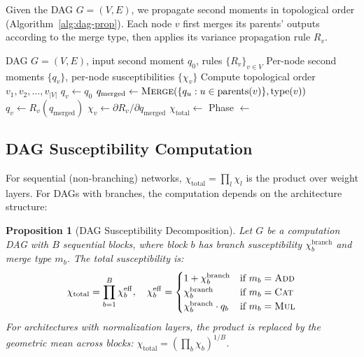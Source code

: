 \documentclass[10pt]{article}
\newtheorem{proposition}[theorem]{Proposition}
\begin{document}
Given the DAG $G = (V, E)$, we propagate second moments in topological order (Algorithm~\ref{alg:dag-prop}).  Each node $v$ first merges its parents' outputs according to the merge type, then applies its variance propagation rule $R_v$.

\begin{algorithm}[t]
\caption{DAG Variance Propagation}
\label{alg:dag-prop}
\begin{algorithmic}[1]
\Require DAG $G = (V,E)$, input second moment $q_0$, rules $\{R_v\}_{v \in V}$
\Ensure Per-node second moments $\{q_v\}$, per-node susceptibilities $\{\chi_v\}$
\State Compute topological order $v_1, v_2, \ldots, v_{|V|}$
        \State $q_v \gets q_0$
    \Else
        \State $q_{\mathrm{merged}} \gets \textsc{Merge}(\{q_u : u \in \mathrm{parents}(v)\}, \mathrm{type}(v))$ 
        \State $q_v \gets R_v(q_{\mathrm{merged}})$
        \State $\chi_v \gets \partial R_v / \partial q_{\mathrm{merged}}$
    \EndIf
\EndFor
\State $\chi_{\mathrm{total}} \gets$  
\State Phase $\gets$ 
\end{algorithmic}
\end{algorithm}

\subsection{DAG Susceptibility Computation}
\label{subsec:dag-chi}

For sequential (non-branching) networks, $\chi_{\mathrm{total}} = \prod_l \chi_l$ is the product over weight layers.
For DAGs with branches, the computation depends on the architecture structure:

\begin{proposition}[DAG Susceptibility Decomposition]
\label{prop:dag-chi}
Let $G$ be a computation DAG with $B$ sequential blocks, where block $b$ has branch susceptibility $\chi_b^{\mathrm{branch}}$ and merge type $m_b$.  The total susceptibility is:
\begin{equation}
    \chi_{\mathrm{total}} = \prod_{b=1}^B \chi_b^{\mathrm{eff}}, \quad
    \chi_b^{\mathrm{eff}} = \begin{cases}
        1 + \chi_b^{\mathrm{branch}} & \text{if } m_b = \textsc{Add} \\
        \chi_b^{\mathrm{branch}} & \text{if } m_b = \textsc{Cat} \\
        \chi_b^{\mathrm{branch}} \cdot q_b & \text{if } m_b = \textsc{Mul}
    \end{cases}
    \label{eq:dag-chi}
\end{equation}
For architectures with normalization layers, the product is replaced by the geometric mean across blocks: $\chi_{\mathrm{total}} = (\prod_b \chi_b)^{1/B}$.
\end{proposition}
\end{document}
